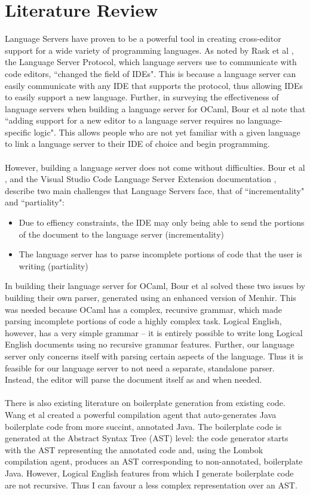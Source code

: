 \documentclass[../main.tex]{subfiles}
\begin{document}
\chapter{Literature Review}
Language Servers have proven to be a powerful tool in creating cross-editor support for a wide variety of programming languages. As noted by Rask et al \cite[]{standardised_lsp_extensions}, the Language Server Protocol, which language servers use to communicate with code editors, ``changed the field of IDEs". This is because a language server can easily communicate with any IDE that supports the protocol, thus allowing IDEs to easily support a new language. Further, in surveying the effectiveness of language servers when building a language server for OCaml, Bour et al \cite[]{merlin_experience_report} note that ``adding support for a new editor to a language server requires no language-specific logic". This allows people who are not yet familiar with a given language to link a language server to their IDE of choice and begin programming. 
\\ \\
However, building a language server does not come without difficulties. Bour et al \cite[]{merlin_experience_report}, and the Visual Studio Code Language Server Extension documentation \cite[]{vsc_langserver_docs}, describe two main challenges that Language Servers face, that of ``incrementality" and ``partiality":
\begin{itemize}
    \item Due to effiency constraints, the IDE may only being able to send the portions of the document to the language server (incrementality)
    \item The language server has to parse incomplete portions of code that the user is writing (partiality)
\end{itemize}
In building their language server for OCaml, Bour et al solved these two issues by building their own parser, generated using an enhanced version of Menhir. This was needed because OCaml has a complex, recursive grammar, which made parsing incomplete portions of code a highly complex task. Logical English, however, has a very simple grammar -- it is entirely possible to write long Logical English documents using no recursive grammar features. Further, our language server only concerns itself with parsing certain aspects of the language. Thus it is feasible for our language server to not need a separate, standalone parser. Instead, the editor will parse the document itself as and when needed.
\\ 
\\
There is also existing literature on boilerplate generation from existing code. Wang et al \cite[]{classless_java} created a powerful compilation agent that auto-generates Java boilerplate code from more succint, annotated Java. The boilerplate code is generated at the Abstract Syntax Tree (AST) level: the code generator starts with the AST representing the annotated code and, using the Lombok compilation agent, produces an AST corresponding to non-annotated, boilerplate Java. However, Logical English features from which I generate boilerplate code are not recursive. Thus I can favour a less complex representation over an AST.

\end{document}
